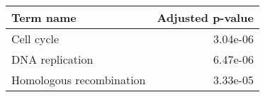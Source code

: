 \begin{tabular}{lr}
\toprule
               Term name &  Adjusted p-value \\
\midrule
              Cell cycle &          3.04e-06 \\
         DNA replication &          6.47e-06 \\
Homologous recombination &          3.33e-05 \\
\bottomrule
\end{tabular}
